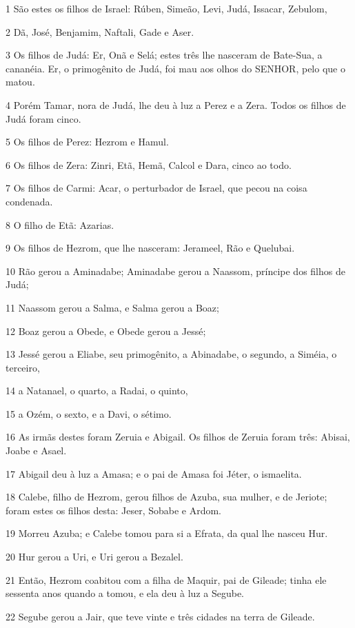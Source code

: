 \par 1 São estes os filhos de Israel: Rúben, Simeão, Levi, Judá, Issacar, Zebulom,
\par 2 Dã, José, Benjamim, Naftali, Gade e Aser.
\par 3 Os filhos de Judá: Er, Onã e Selá; estes três lhe nasceram de Bate-Sua, a cananéia. Er, o primogênito de Judá, foi mau aos olhos do SENHOR, pelo que o matou.
\par 4 Porém Tamar, nora de Judá, lhe deu à luz a Perez e a Zera. Todos os filhos de Judá foram cinco.
\par 5 Os filhos de Perez: Hezrom e Hamul.
\par 6 Os filhos de Zera: Zinri, Etã, Hemã, Calcol e Dara, cinco ao todo.
\par 7 Os filhos de Carmi: Acar, o perturbador de Israel, que pecou na coisa condenada.
\par 8 O filho de Etã: Azarias.
\par 9 Os filhos de Hezrom, que lhe nasceram: Jerameel, Rão e Quelubai.
\par 10 Rão gerou a Aminadabe; Aminadabe gerou a Naassom, príncipe dos filhos de Judá;
\par 11 Naassom gerou a Salma, e Salma gerou a Boaz;
\par 12 Boaz gerou a Obede, e Obede gerou a Jessé;
\par 13 Jessé gerou a Eliabe, seu primogênito, a Abinadabe, o segundo, a Siméia, o terceiro,
\par 14 a Natanael, o quarto, a Radai, o quinto,
\par 15 a Ozém, o sexto, e a Davi, o sétimo.
\par 16 As irmãs destes foram Zeruia e Abigail. Os filhos de Zeruia foram três: Abisai, Joabe e Asael.
\par 17 Abigail deu à luz a Amasa; e o pai de Amasa foi Jéter, o ismaelita.
\par 18 Calebe, filho de Hezrom, gerou filhos de Azuba, sua mulher, e de Jeriote; foram estes os filhos desta: Jeser, Sobabe e Ardom.
\par 19 Morreu Azuba; e Calebe tomou para si a Efrata, da qual lhe nasceu Hur.
\par 20 Hur gerou a Uri, e Uri gerou a Bezalel.
\par 21 Então, Hezrom coabitou com a filha de Maquir, pai de Gileade; tinha ele sessenta anos quando a tomou, e ela deu à luz a Segube.
\par 22 Segube gerou a Jair, que teve vinte e três cidades na terra de Gileade.
